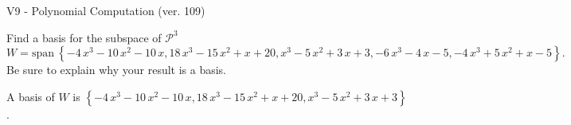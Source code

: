 \begin{exercise}
  \begin{exerciseTitle}V9 - Polynomial Computation (ver. 109)\end{exerciseTitle}
  \begin{exerciseStatement}
    Find a basis for the subspace of \(\mathcal{P}^3\) 
\[W=\mathrm{span}\ \left\{-4 \, x^{3} - 10 \, x^{2} - 10 \, x , 18 \, x^{3} - 15 \, x^{2} + x + 20 , x^{3} - 5 \, x^{2} + 3 \, x + 3 , -6 \, x^{3} - 4 \, x - 5 , -4 \, x^{3} + 5 \, x^{2} + x - 5\right\}.\]
 Be sure to explain why your result is a basis.


  \end{exerciseStatement}
  \begin{exerciseAnswer}
   A basis of \(W\) is  \(\left\{-4 \, x^{3} - 10 \, x^{2} - 10 \, x , 18 \, x^{3} - 15 \, x^{2} + x + 20 , x^{3} - 5 \, x^{2} + 3 \, x + 3\right\}\).
  


  \end{exerciseAnswer}
\end{exercise}